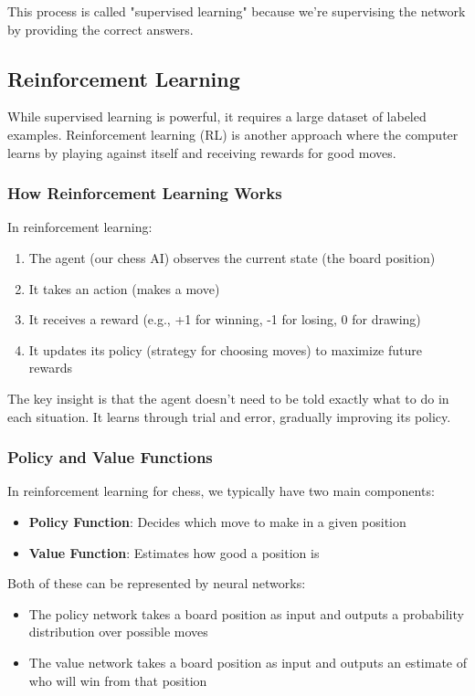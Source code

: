 \documentclass[11pt]{article}
\begin{document}
This process is called "supervised learning" because we're supervising the network by providing the correct answers.

\subsection{Reinforcement Learning}

While supervised learning is powerful, it requires a large dataset of labeled examples. Reinforcement learning (RL) is another approach where the computer learns by playing against itself and receiving rewards for good moves.

\subsubsection{How Reinforcement Learning Works}

In reinforcement learning:
\begin{enumerate}
    \item The agent (our chess AI) observes the current state (the board position)
    \item It takes an action (makes a move)
    \item It receives a reward (e.g., +1 for winning, -1 for losing, 0 for drawing)
    \item It updates its policy (strategy for choosing moves) to maximize future rewards
\end{enumerate}

The key insight is that the agent doesn't need to be told exactly what to do in each situation. It learns through trial and error, gradually improving its policy.

\subsubsection{Policy and Value Functions}

In reinforcement learning for chess, we typically have two main components:
\begin{itemize}
    \item \textbf{Policy Function}: Decides which move to make in a given position
    \item \textbf{Value Function}: Estimates how good a position is
\end{itemize}

Both of these can be represented by neural networks:
\begin{itemize}
    \item The policy network takes a board position as input and outputs a probability distribution over possible moves
    \item The value network takes a board position as input and outputs an estimate of who will win from that position
\end{itemize}
\end{document}
